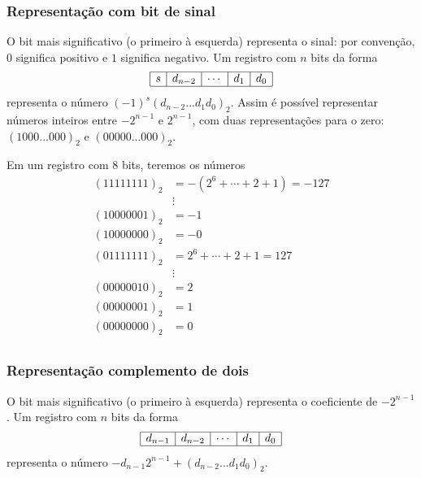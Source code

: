\documentclass[main.tex]{subfiles}
\begin{document}
\subsubsection{Representação com bit de sinal}
O bit mais significativo (o primeiro à esquerda) representa o sinal: por convenção, $0$ significa positivo e $1$ significa negativo. Um registro com $n$ bits da forma
\begin{equation*}
  \begin{array}{|c|c|c|c|c|} \hline
    s & d_{n-2} & \cdots & d_1 & d_0 \\\hline
  \end{array}  
\end{equation*}
representa o número $(-1)^s(d_{n-2}...d_1d_0)_2$. Assim é possível representar números inteiros entre $-2^{n-1}$ e $2^{n-1}$, com duas representações para o zero: $(1000...000)_2$ e $(00000...000)_2$.

\begin{ex}
Em um registro com $8$ bits, teremos os números
\begin{equation*}
\begin{array}{cl}
 (11111111)_2 &= -(2^{6}+\cdots+2+1)=-127\\
     &\vdots    \\
 (10000001)_2 &= -1 \\
 (10000000)_2 &= -0 \\
 (01111111)_2 &= 2^6+\cdots+2+1=127 \\
     &\vdots    \\
 (00000010)_2 &= 2 \\
 (00000001)_2 &= 1 \\
 (00000000)_2 &= 0 \\
\end{array}  
\end{equation*}
\end{ex}


\subsubsection{Representação complemento de dois}
O bit mais significativo (o primeiro à esquerda) representa o coeficiente de $-2^{n-1}$.  Um registro com $n$ bits da forma
\begin{equation*}
  \begin{array}{|c|c|c|c|c|} \hline
    d_{n-1}&d_{n-2}&\cdots&d_1&d_0\\\hline
  \end{array}  
\end{equation*}
representa o número $-d_{n-1}2^{n-1}+(d_{n-2}...d_1d_0)_2$. 
\end{document}

